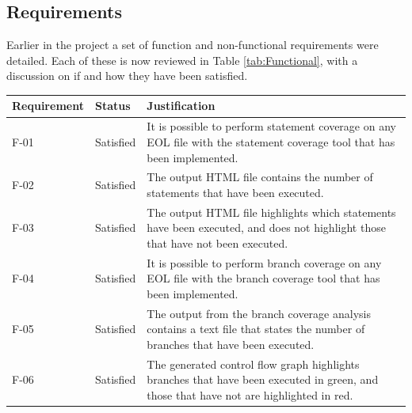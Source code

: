
\subsection{Requirements}

Earlier in the project a set of function and non-functional requirements were detailed. Each of these is now reviewed in Table \ref{tab:Functional}, with a discussion on if and how they have been satisfied.

\begin{table}[h]
    \begin{tabular}{|l|l|p{4.5in}|} \hline
    Requirement & Status        & Justification                                                                                                                                                                                   \\\hline
    F-01        & Satisfied     & It is possible to perform statement coverage on any EOL file with the statement coverage tool that has been implemented.                                                                        \\\hline
    F-02        & Satisfied     & The output HTML file contains the number of statements that have been executed.                                                                                                                 \\\hline
    F-03        & Satisfied     & The output HTML file highlights which statements have been executed, and does not highlight those that have not been executed.                                                                  \\\hline
    F-04        & Satisfied     & It is possible to perform branch coverage on any EOL file with the branch coverage tool that has been implemented.                                                                              \\\hline
    F-05        & Satisfied     & The output from the branch coverage analysis contains a text file that states the number of branches that have been executed.                                                                   \\\hline
    F-06        & Satisfied     & The generated control flow graph highlights branches that have been executed in green, and those that have not are highlighted in red.                                                          \\\hline

\end{tabular}
\end{table}
